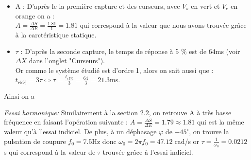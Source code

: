 \documentclass[12pt]{article}
\begin{document}
\begin{itemize}
    \item A : D'après le la première capture et des curseurs, avec $V_s$ en vert et $V_e$ en orange on a :
    \\$A = \frac{\Delta S}{\Delta E} = \frac{1.81}{1} = 1.81$ qui correspond à la valeur que nous avons trouvée grâce à la carctéristique statique.
    \item $\tau$ : D'après la seconde capture, le temps de réponse à 5 $\%$ est de 64ms (voir $\Delta X$ dans l'onglet "Curseurs"). 
    \\Or comme le système étudié est d'ordre 1, alors on sait aussi que :
    \\$t_{r5\%} = 3\tau \Leftrightarrow \tau = \frac{t_{r5\%}}{3} = \frac{64}{3} = 21.3$ms.
\end{itemize}
\begin{center}
Ainsi on a 

\end{center}

\underline{\itshape Essai harmonique:} Similairement à la section 2.2, on retrouve A à très basse fréquence en faisant l'opération suivante : $A = \frac{\Delta S}{\Delta E} = 1.79 \approx 1.81$ qui est la même valeur qu'à l'essai indiciel.
De plus, à un déphasage $\varphi$ de $-45^\circ$, on trouve la pulsation de coupure $f_0 = 7.5$Hz donc $\omega_0 = 2\pi f_0 = 47.12$ rad/s or $\tau = \frac{1}{\omega_0} = 0.0212$s qui correspond à la valeur de $\tau$ trouvée grâce à l'essai indiciel.
\end{document}
